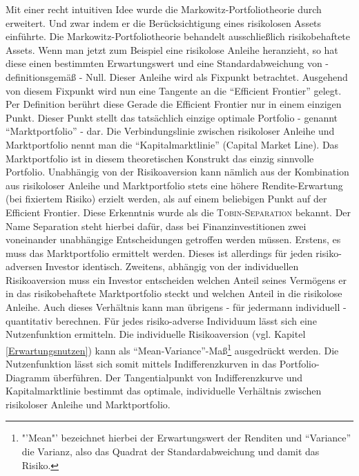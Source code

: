 Mit einer recht intuitiven Idee wurde die Markowitz-Portfoliotheorie durch \textcite{Tobin1958} erweitert. Und zwar indem er die Berücksichtigung eines risikolosen Assets einführte. Die Markowitz-Portfoliotheorie behandelt ausschließlich risikobehaftete Assets. Wenn man jetzt zum Beispiel eine risikolose Anleihe heranzieht, so hat diese einen bestimmten Erwartungswert und eine Standardabweichung von - definitionsgemäß - Null. Dieser Anleihe wird als Fixpunkt betrachtet. Ausgehend von diesem Fixpunkt wird nun eine Tangente an die "`Efficient Frontier"' gelegt. Per Definition berührt diese Gerade die Efficient Frontier nur in einem einzigen Punkt. Dieser Punkt stellt das tatsächlich einzige optimale Portfolio - genannt "`Marktportfolio"' - dar. Die Verbindungslinie zwischen risikoloser Anleihe und Marktportfolio nennt man die "`Kapitalmarktlinie"' (Capital Market Line). Das Marktportfolio ist in diesem theoretischen Konstrukt das einzig sinnvolle Portfolio. Unabhängig von der Risikoaversion kann nämlich aus der Kombination aus risikoloser Anleihe und Marktportfolio stets eine höhere Rendite-Erwartung (bei fixiertem Risiko) erzielt werden, als auf einem beliebigen Punkt auf der Efficient Frontier. Diese Erkenntnis wurde als die \textsc{Tobin-Separation} bekannt. Der Name Separation steht hierbei dafür, dass bei Finanzinvestitionen zwei voneinander unabhängige Entscheidungen getroffen werden müssen. Erstens, es muss das Marktportfolio ermittelt werden. Dieses ist allerdings für jeden risiko-adversen Investor identisch. Zweitens, abhängig von der individuellen Risikoaversion muss ein Investor entscheiden welchen Anteil seines Vermögens er in das risikobehaftete Marktportfolio steckt und welchen Anteil in die risikolose Anleihe. Auch dieses Verhältnis kann man übrigens - für jedermann individuell - quantitativ berechnen. Für jedes risiko-adverse Individuum lässt sich eine Nutzenfunktion ermitteln. Die individuelle Risikoaversion (vgl. Kapitel \ref{Erwartungsnutzen}) kann als "`Mean-Variance"'-Maß\footnote{"'Mean"' bezeichnet hierbei der Erwartungswert der Renditen und "`Variance"' die Varianz, also das Quadrat der Standardabweichung und damit das Risiko.} ausgedrückt werden. Die Nutzenfunktion lässt sich somit mittels Indifferenzkurven in das Portfolio-Diagramm überführen. Der Tangentialpunkt von Indifferenzkurve und Kapitalmarktlinie bestimmt das optimale, individuelle Verhältnis zwischen risikoloser Anleihe und Marktportfolio.

